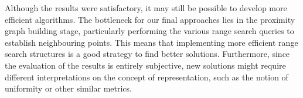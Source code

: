 Although the results were satisfactory, it may still be possible to develop more efficient algorithms. The bottleneck for our final approaches lies in the proximity graph building stage, particularly performing the various range search queries to establish neighbouring points. This means that implementing more efficient range search structures is a good strategy to find better solutions. Furthermore, since the evaluation of the results is entirely subjective, new solutions might require different interpretations on the concept of representation, such as the notion of uniformity or other similar metrics. 
